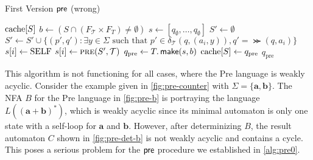 \begin{algorithm}
\caption{First Version $\operatorname{\textsf{pre}}$ (wrong)}\label{alg:pre0}
\begin{algorithmic}[1]\smallskip
{}
\If{$\cache[S]$}		
\Return $\cache[S]$		
\EndIf
\State $b \gets (S \cap (F_{\mathcal{T}} \times F_{T} ) \neq \emptyset)$ 
\State $s \gets [q_{\emptyset},\dots,q_{\emptyset}]$
\State $S' \gets \emptyset$ 	%
\State $S' \gets S' \cup \{(p',q'): \exists y \in \Sigma \text{ such that } p' \in \delta_{\mathcal{T}}(q,(a_{i},y)), q' = \Succ(q,a_{i})\}$
\EndFor
{}	
\State $s[i] \gets \mathrm{SELF}$	
\Else
\State $s[i] \gets \Call{pre}{S',\mathcal{T}}$	
\EndIf
\EndFor
\State $q_{\text{pre}} \gets T.\operatorname{\textsf{make}}(s,b)$	
\State $\mathrm{cache}[S] \gets q_{\text{pre}}$		
\Return $q_{\text{pre}} $
\EndProcedure
\end{algorithmic}
\end{algorithm}

This algorithm is not functioning for all cases, where the Pre language is weakly acyclic. Consider the example given in \autoref{fig:pre-counter} with $\Sigma = \{\bm{a},\bm{b}\}$. The NFA $B$ for the Pre language in \autoref{fig:pre-b} is portraying the language $L(\bm{(a+b)^{*}})$, which is weakly acyclic since its minimal automaton is only one state with a self-loop for $\bm{a}$ and $\bm{b}$. However, after determinizing $B$, the result automaton $C$ shown in \autoref{fig:pre-det-b} is not weakly acyclic and contains a cycle. This poses a serious problem for the $\operatorname{\textsf{pre}}$ procedure we established in \autoref{alg:pre0}.


